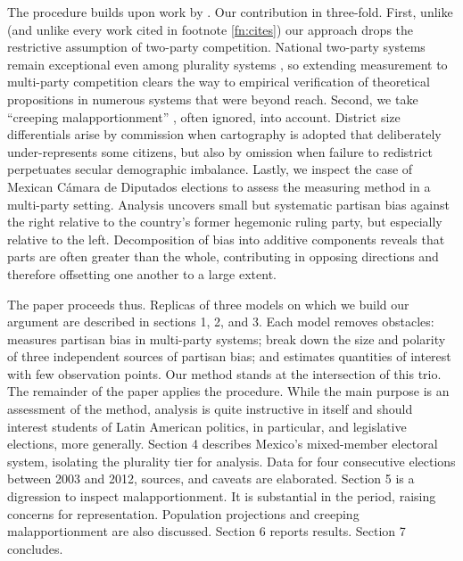 \documentclass[letter,12pt]{article}
\begin{document}
The procedure builds upon work by \citet{grofman.etalBiasMalapp.1997}. Our contribution in three-fold. First, unlike \citeauthor{grofman.etalBiasMalapp.1997} (and unlike every work cited in footnote \ref{fn:cites}) our approach drops the restrictive assumption of two-party competition. National two-party systems remain exceptional even among plurality systems \citep{cox.1997}, so extending measurement to multi-party competition clears the way to empirical verification of theoretical propositions in numerous systems that were beyond reach. Second, we take ``creeping malapportionment'' \citep{johnston.2002}, often ignored, into account. District size differentials arise by commission when cartography is adopted that deliberately under-represents some citizens, but also by omission when failure to redistrict perpetuates secular demographic imbalance. Lastly, we inspect the case of Mexican C\'amara de Diputados elections to assess the measuring method in a multi-party setting. Analysis uncovers small but systematic partisan bias against the right relative to the country's former hegemonic ruling party, but especially relative to the left. Decomposition of bias into additive components reveals that parts are often greater than the whole, contributing in opposing directions and therefore offsetting one another to a large extent. 

The paper proceeds thus. Replicas of three models on which we build our argument are described in sections 1, 2, and 3. Each model removes obstacles: \citet{king.1990elRespBiasMultiparty} measures partisan bias in multi-party systems; \citet{grofman.etalBiasMalapp.1997} break down the size and polarity of three independent sources of partisan bias; and \citet{linzerSeatVoteElasticity2012} estimates quantities of interest with few observation points. Our method stands at the intersection of this trio. The remainder of the paper applies the procedure. While the main purpose is an assessment of the method, analysis is quite instructive in itself and should interest students of Latin American politics, in particular, and legislative elections, more generally. Section 4 describes Mexico's mixed-member electoral system, isolating the plurality tier for analysis. Data for four consecutive elections between 2003 and 2012, sources, and caveats are elaborated. Section 5 is a digression to inspect malapportionment. It is substantial in the period, raising concerns for representation. Population projections and creeping malapportionment are also discussed. Section 6 reports results. Section 7 concludes. 
\end{document}
